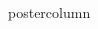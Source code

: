 \documentclass[final,hyperref={pdfpagelabels=false}]{beamer}
\newlength{\columnheight}
\begin{document}
\begin{frame}
\begin{columns}
\begin{column}{.49\textwidth}
\begin{beamercolorbox}[center,wd=\textwidth]{postercolumn}
			            

      \end{beamercolorbox}
    \end{column}

    \begin{column}{.49\textwidth}


\end{column}
\end{columns}
\end{frame}
\end{document}
